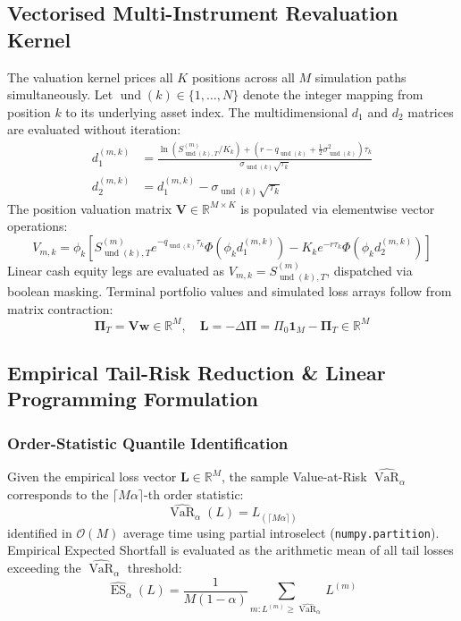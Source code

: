\documentclass{article}
\theoremstyle{plain}
\theoremstyle{definition}
\theoremstyle{remark}
\DeclareMathOperator{\VaR}{VaR}
\DeclareMathOperator{\ES}{ES}
\begin{document}
\subsection{Vectorised Multi-Instrument Revaluation Kernel}
The valuation kernel prices all $K$ positions across all $M$ simulation paths simultaneously. Let $\operatorname{und}(k) \in \{1, \dots, N\}$ denote the integer mapping from position $k$ to its underlying asset index. The multidimensional $d_1$ and $d_2$ matrices are evaluated without iteration:
\begin{align}
    d_1^{(m, k)} &= \frac{\ln\left(S_{\operatorname{und}(k), T}^{(m)} / K_k\right) + \left(r - q_{\operatorname{und}(k)} + \frac{1}{2}\sigma_{\operatorname{und}(k)}^2\right)\tau_k}{\sigma_{\operatorname{und}(k)}\sqrt{\tau_k}} \\
    d_2^{(m, k)} &= d_1^{(m, k)} - \sigma_{\operatorname{und}(k)}\sqrt{\tau_k}
\end{align}
The position valuation matrix $\mathbf{V} \in \mathbb{R}^{M \times K}$ is populated via elementwise vector operations:
\begin{equation}
    V_{m, k} = \phi_k \left[ S_{\operatorname{und}(k), T}^{(m)} e^{-q_{\operatorname{und}(k)}\tau_k}\Phi(\phi_k d_1^{(m, k)}) - K_k e^{-r\tau_k}\Phi(\phi_k d_2^{(m, k)}) \right]
\end{equation}
Linear cash equity legs are evaluated as $V_{m, k} = S_{\operatorname{und}(k), T}^{(m)}$, dispatched via boolean masking. Terminal portfolio values and simulated loss arrays follow from matrix contraction:
\begin{equation}
    \boldsymbol{\Pi}_T = \mathbf{V}\mathbf{w} \in \mathbb{R}^M, \quad \mathbf{L} = -\Delta \boldsymbol{\Pi} = \Pi_0 \mathbf{1}_M - \boldsymbol{\Pi}_T \in \mathbb{R}^M
\end{equation}

\subsection{Empirical Tail-Risk Reduction \& Linear Programming Formulation}

\subsubsection{Order-Statistic Quantile Identification}
Given the empirical loss vector $\mathbf{L} \in \mathbb{R}^M$, the sample Value-at-Risk $\widehat{\VaR}_\alpha$ corresponds to the $\lceil M\alpha \rceil$-th order statistic:
\begin{equation}
    \widehat{\VaR}_\alpha(L) = L_{(\lceil M\alpha \rceil)}
\end{equation}
identified in $\mathcal{O}(M)$ average time using partial introselect (\texttt{numpy.partition}). Empirical Expected Shortfall is evaluated as the arithmetic mean of all tail losses exceeding the $\widehat{\VaR}_\alpha$ threshold:
\begin{equation}
    \widehat{\ES}_\alpha(L) = \frac{1}{M(1 - \alpha)} \sum_{m: L^{(m)} \ge \widehat{\VaR}_\alpha} L^{(m)}
\end{equation}
\end{document}
